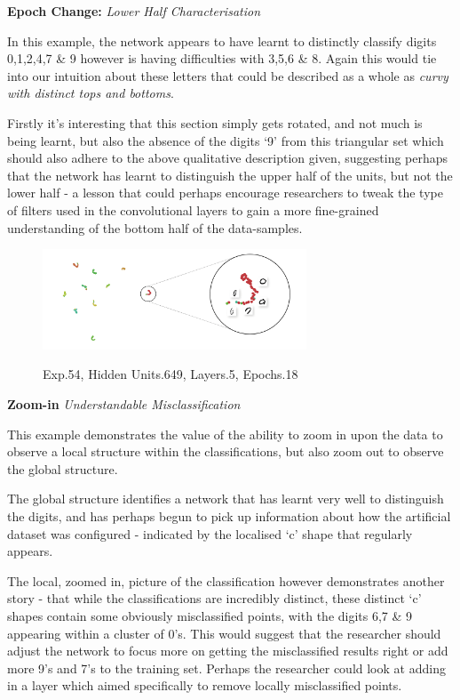 \documentclass[a4paper,11pt,titlepage]{article}
\begin{document}
	\textbf{Epoch Change:} \textit{Lower Half Characterisation}
	\par 
	In this example, the network appears to have learnt to distinctly classify digits 0,1,2,4,7 \& 9 however is having difficulties with 3,5,6 \& 8. Again this would tie into our intuition about these letters that could be described as a whole as \textit{curvy with distinct tops and bottoms}. 
	\par 
	Firstly it's interesting that this section simply gets rotated, and not much is being learnt, but also the absence of the digits `9' from this triangular set which should also adhere to the above qualitative description given, suggesting perhaps that the network has learnt to distinguish the upper half of the units, but not the lower half - a lesson that could perhaps encourage researchers to tweak the type of filters used in the convolutional layers to gain a more fine-grained understanding of the bottom half of the data-samples.

	\begin{figure}[H]
    			\centering	
			{{\includegraphics[width=0.7\textwidth]
    				{img/conc_X54_H649_L5_E18.png} 
    			}}%
    			\caption{Exp.54, Hidden Units.649, Layers.5, Epochs.18}%
    		\label{fig:mnistHinton}
	\end{figure}
	
	\textbf{Zoom-in}	\textit{Understandable Misclassification}
	\par 
	This example demonstrates the value of the ability to zoom in upon the data to observe a local structure within the classifications, but also zoom out to observe the global structure.
	\par 
	The global structure identifies a network that has learnt very well to distinguish the digits, and has perhaps begun to pick up information about how the artificial dataset was configured - indicated by the localised `c' shape that regularly appears. 
	\par 
	The local, zoomed in, picture of the classification however demonstrates another story - that while the classifications are incredibly distinct, these distinct `c' shapes contain some obviously misclassified points, with the digits 6,7 \& 9 appearing within a cluster of 0's. This would suggest that the researcher should adjust the network to focus more on getting the misclassified results right or add more 9's and 7's to the training set. Perhaps the researcher could look at adding in a layer which aimed specifically to remove locally misclassified points.
	
\end{document}
